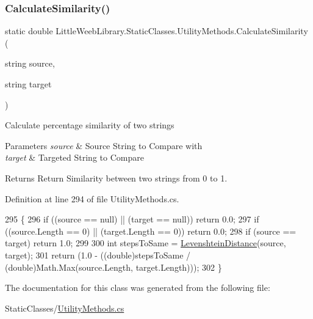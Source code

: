 \subsubsection{\texorpdfstring{Calculate\+Similarity()}{CalculateSimilarity()}}
{\footnotesize\ttfamily static double Little\+Weeb\+Library.\+Static\+Classes.\+Utility\+Methods.\+Calculate\+Similarity (\begin{DoxyParamCaption}\item[{string}]{source,  }\item[{string}]{target }\end{DoxyParamCaption})\hspace{0.3cm}{\ttfamily [static]}}



Calculate percentage similarity of two strings 
\begin{DoxyParams}{Parameters}
{\em source} & Source String to Compare with\\
\hline
{\em target} & Targeted String to Compare\\
\hline
\end{DoxyParams}
\begin{DoxyReturn}{Returns}
Return Similarity between two strings from 0 to 1.
\end{DoxyReturn}




Definition at line 294 of file Utility\+Methods.\+cs.


\begin{DoxyCode}
295         \{
296             \textcolor{keywordflow}{if} ((source == null) || (target == null)) \textcolor{keywordflow}{return} 0.0;
297             \textcolor{keywordflow}{if} ((source.Length == 0) || (target.Length == 0)) \textcolor{keywordflow}{return} 0.0;
298             \textcolor{keywordflow}{if} (source == target) \textcolor{keywordflow}{return} 1.0;
299 
300             \textcolor{keywordtype}{int} stepsToSame = \mbox{\hyperlink{class_little_weeb_library_1_1_static_classes_1_1_utility_methods_aaa6b7e7b9ba5429a7c91ef95bb408653}{LevenshteinDistance}}(source, target);
301             \textcolor{keywordflow}{return} (1.0 - ((\textcolor{keywordtype}{double})stepsToSame / (\textcolor{keywordtype}{double})Math.Max(source.Length, target.Length)));
302         \}
\end{DoxyCode}


The documentation for this class was generated from the following file\+:\begin{DoxyCompactItemize}
\item 
Static\+Classes/\mbox{\hyperlink{_utility_methods_8cs}{Utility\+Methods.\+cs}}\end{DoxyCompactItemize}
